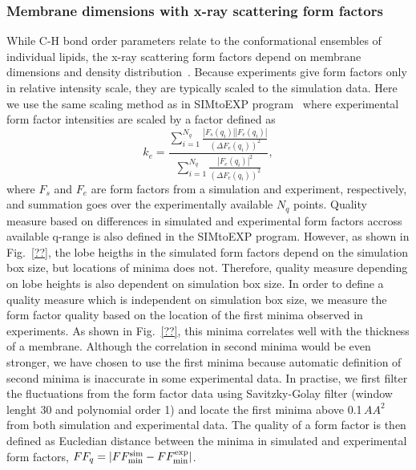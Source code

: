 \documentclass[fleqn,10pt]{wlscirep}
\begin{document}
\subsubsection{Membrane dimensions with x-ray scattering form factors}
While C-H bond order parameters relate to the conformational ensembles of individual lipids,
the x-ray scattering form factors depend on membrane dimensions and density distribution~\cite{ollila16}.
Because experiments give form factors only in relative intensity scale, they are typically scaled to the simulation data.
Here we use the same scaling method as in SIMtoEXP program~\cite{kucerka10} where experimental form factor intensities
are scaled by a factor defined as
\begin{equation}
    k_e = \frac{\sum_{i=1}^{N_q} \frac{|F_s(q_i)||F_e(q_i)|}{(\Delta F_e(q_i))^2}}{\sum_{i=1}^{N_q} \frac{|F_e(q_i)|^2}{(\Delta F_e(q_i))^2}},
\end{equation}
where $F_s$ and $F_e$ are form factors from a simulation and experiment, respectively, and summation goes over the experimentally available $N_q$ points. 
Quality measure based on differences in simulated and experimental form factors accross available q-range is also defined in the SIMtoEXP program.
However, as shown in Fig.~\ref{??}, the lobe heigths in the simulated form factors depend on the simulation box size,
but locations of minima does not. Therefore, quality measure depending on lobe heights is also dependent on simulation box size.
In order to define a quality measure which is independent on simulation box size, we measure the form factor quality based on the
location of the first minima observed in experiments. As shown in Fig.~\ref{??}, this minima correlates well with the thickness of a membrane.
Although the correlation in second minima would be even stronger, we have chosen to use the first minima because automatic definition
of second minima is inaccurate in some experimental data. In practise, we first filter the fluctuations from the form factor data using
Savitzky-Golay filter (window lenght 30 and polynomial order 1) and locate the first minima above 0.1\,$AA^2$ from both simulation and experimental data.
The quality of a form factor is then defined as Eucledian distance between the minima in simulated and experimental form factors, $FF_q = |FF_{\rm{min}}^{\rm{sim}}-FF_{\rm{min}}^{\rm{exp}}|$. 
\end{document}
